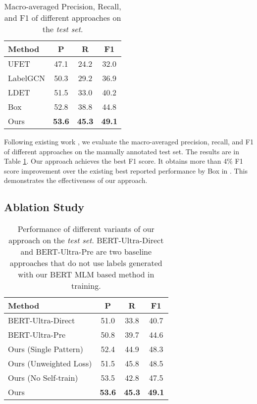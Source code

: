 \documentclass[11pt,a4paper]{article}
\begin{document}
\begin{table}
\centering
\begin{tabular}{lccc}
\hline \textbf{Method} & \textbf{P} & \textbf{R} & \textbf{F1} \\ \hline
UFET & 47.1 & 24.2 & 32.0 \\
LabelGCN & 50.3 & 29.2 & 36.9 \\
LDET & 51.5 & 33.0 & 40.2 \\
Box & 52.8 & 38.8 & 44.8 \\ \hline
Ours & \textbf{53.6} & \textbf{45.3} & \textbf{49.1} \\ \hline
\end{tabular}
\caption{\label{tab:performance-main} Macro-averaged Precision, Recall, and F1 of different approaches on the \textit{test set}.}
\end{table}

Following existing work \cite{onoe2021modeling,onoe2019learning}, we evaluate the macro-averaged precision, recall, and F1 of different approaches on the manually annotated test set. The results are in Table \ref{tab:performance-main}. Our approach achieves the best F1 score. It obtains more than 4\% F1 score improvement over the existing best reported performance by Box in \cite{onoe2021modeling}. This demonstrates the effectiveness of our approach.





\subsection{Ablation Study}
\label{sec:ablation}

\begin{table}
\centering
\begin{tabular}{lccc}
\hline \textbf{Method} & \textbf{P} & \textbf{R} & \textbf{F1} \\ \hline
BERT-Ultra-Direct & 51.0 & 33.8 & 40.7 \\ 
BERT-Ultra-Pre & 50.8 & 39.7 & 44.6 \\
Ours (Single Pattern) & 52.4 & 44.9 & 48.3 \\
Ours (Unweighted Loss) & 51.5 & 45.8 & 48.5 \\
Ours (No Self-train) & 53.5 & 42.8 & 47.5 \\
Ours & \textbf{53.6} & \textbf{45.3} & \textbf{49.1} \\ \hline
\end{tabular}
\caption{\label{tab:performance-abl} Performance of different variants of our approach on the \textit{test set}. BERT-Ultra-Direct and BERT-Ultra-Pre are two baseline approaches that do not use labels generated with our BERT MLM based method in training.
}
\end{table}
\end{document}
